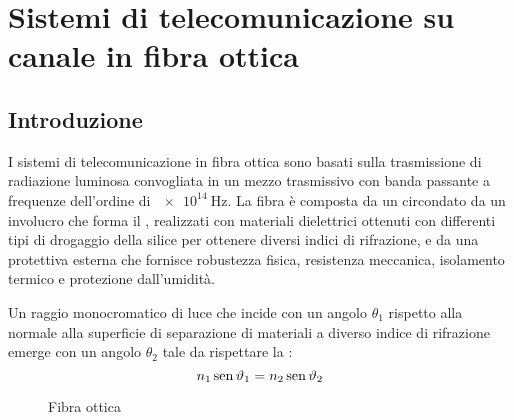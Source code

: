 \chapter{Sistemi di telecomunicazione su canale in fibra ottica}
\section{Introduzione}
I sistemi di telecomunicazione in fibra ottica sono basati sulla trasmissione di radiazione luminosa convogliata in un mezzo trasmissivo con banda passante a frequenze dell'ordine di $\SI{e14}{\hertz}$. La fibra è composta da un  circondato da un involucro che forma il , realizzati con materiali dielettrici ottenuti con differenti tipi di drogaggio della silice per ottenere diversi indici di rifrazione, e da una  protettiva esterna che fornisce robustezza fisica, resistenza meccanica, isolamento termico e protezione dall'umidità.

Un raggio monocromatico di luce che incide con un angolo $\theta_1$ rispetto alla normale alla superficie di separazione di materiali a diverso indice di rifrazione emerge con un angolo $\theta_2$ tale da rispettare la :
\begin{equation}
n_1\operatorname{sen}{\vartheta_1}=n_2\operatorname{sen}{\vartheta_2}
\end{equation}

\begin{figure}[!ht]
\centering
{}\quad{}
\caption{Fibra ottica }
\end{figure}

